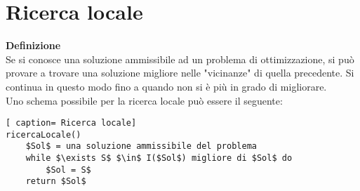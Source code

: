 \documentclass[../cheatSheetAlgoritmi.tex]{subfiles}
\begin{document}
\section{Ricerca locale}
\textbf{Definizione}\\
Se si conosce una soluzione ammissibile ad un problema di ottimizzazione, si può provare a trovare una soluzione migliore nelle "vicinanze" di quella precedente. Si continua in questo modo fino a quando non si è più in grado di migliorare. \\
Uno schema possibile per la ricerca locale può essere il seguente:
\begin{lstlisting}[ caption= Ricerca locale]
ricercaLocale()
	$Sol$ = una soluzione ammissibile del problema
	while $\exists S$ $\in$ I($Sol$) migliore di $Sol$ do
		$Sol = S$
	return $Sol$
\end{lstlisting}
\end{document}
